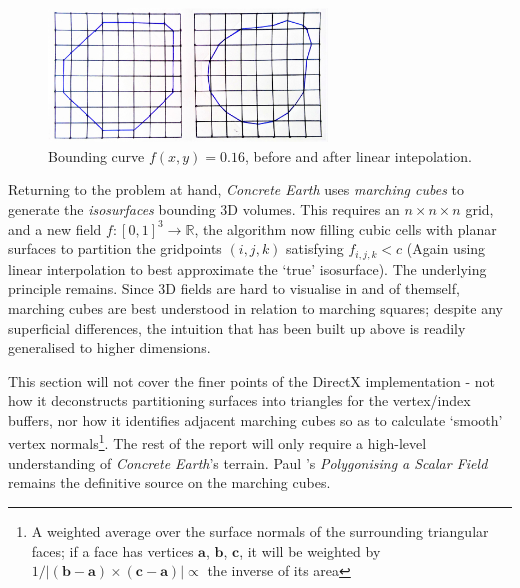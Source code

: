 \documentclass[a4paper, 11pt]{article}
\begin{document}
\begin{flushleft}
\begin{figure}[h]
\centering
\includegraphics[width=0.66\textwidth]{Interpolated Marching Squares}
\caption{Bounding curve $f(x,y) = 0.16$, before and after linear intepolation.}
\label{Interpolated Marching Squares}
\end{figure}

Returning to the problem at hand, \textit{Concrete Earth} uses \textit{marching cubes} to generate the \textit{isosurfaces} bounding 3D volumes. This requires an $n \times n \times n$ grid, and a new field $f: \left[0,1\right]^3 \rightarrow \mathbb{R}$, the algorithm now filling cubic cells with planar surfaces to partition the gridpoints $(i,j,k)$ satisfying $f_{i,j,k} < c$ (Again using linear interpolation to best approximate  the `true' isosurface). The underlying principle remains. Since 3D fields are hard to visualise in and of themself, marching cubes are best understood in relation to marching squares; despite any superficial differences, the intuition that has been built up above is readily generalised to higher dimensions.

\vspace{5pt}\noindent
This section will not cover the finer points of the DirectX implementation - not how it deconstructs partitioning surfaces into triangles for the vertex/index buffers, nor how it identifies adjacent marching cubes so as to calculate `smooth' vertex normals\footnote{A weighted average over the surface normals of the surrounding triangular faces; if a face has vertices $\mathbf{a}$, $\mathbf{b}$, $\mathbf{c}$, it will be weighted by $1/|(\mathbf{b}-\mathbf{a})\times(\mathbf{c}-\mathbf{a})| \propto$ the inverse of its area}. The rest of the report will only require a high-level understanding of \textit{Concrete Earth}'s terrain. Paul \citeauthor{bourkeMarchingCubes}'s \textit{Polygonising a Scalar Field} \citeyearpar{bourkeMarchingCubes} remains the definitive source on the marching cubes. %


\end{flushleft}
\end{document}
